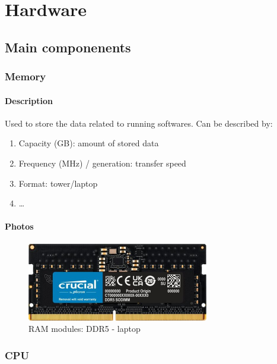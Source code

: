 \documentclass[11pt]{article}
\begin{document}
	\section{Hardware}

		\subsection{Main componenents}

			\subsubsection{Memory}

				\paragraph{Description}
					Used to store the data related to running softwares. Can be described by:
					\begin{enumerate}
							\item Capacity (GB): amount of stored data
							\item Frequency (MHz) / generation: transfer speed
							\item Format: tower/laptop
							\item \ldots
					\end{enumerate}

				\paragraph{Photos}
					\begin{figure}[!h]
							\centering
							\includegraphics[width=300px]{figures/ram.jpg}
							\caption{RAM modules: DDR5 - laptop}
					\end{figure}

			\subsubsection{CPU}
\end{document}
